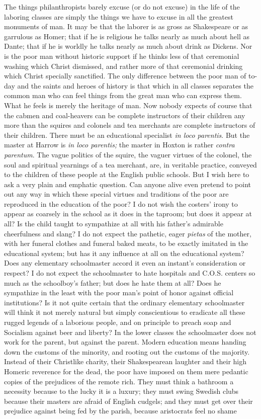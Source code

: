 \documentclass{book}
\begin{document}
The things philanthropists barely excuse (or do not excuse) in the life of the laboring classes are simply the things we have to excuse in all the greatest monuments of man. It may be that the laborer is as gross as Shakespeare or as garrulous as Homer; that if he is religious he talks nearly as much about hell as Dante; that if he is worldly he talks nearly as much about drink as Dickens. Nor is the poor man without historic support if he thinks less of that ceremonial washing which Christ dismissed, and rather more of that ceremonial drinking which Christ specially sanctified. The only difference between the poor man of to-day and the saints and heroes of history is that which in all classes separates the common man who can feel things from the great man who can express them. What he feels is merely the heritage of man. Now nobody expects of course that the cabmen and coal-heavers can be complete instructors of their children any more than the squires and colonels and tea merchants are complete instructors of their children. There must be an educational specialist \emph{in loco parentis}. But the master at Harrow is \emph{in loco parentis;} the master in Hoxton is rather \emph{contra parentum}. The vague politics of the squire, the vaguer virtues of the colonel, the soul and spiritual yearnings of a tea merchant, are, in veritable practice, conveyed to the children of these people at the English public schools. But I wish here to ask a very plain and emphatic question. Can anyone alive even pretend to point out any way in which these special virtues and traditions of the poor are reproduced in the education of the poor? I do not wish the costers’ irony to appear as coarsely in the school as it does in the taproom; but does it appear at all? Is the child taught to sympathize at all with his father’s admirable cheerfulness and slang? I do not expect the pathetic, eager \emph{pietas} of the mother, with her funeral clothes and funeral baked meats, to be exactly imitated in the educational system; but has it any influence at all on the educational system? Does any elementary schoolmaster accord it even an instant’s consideration or respect? I do not expect the schoolmaster to hate hospitals and C.O.S. centers so much as the schoolboy’s father; but does he hate them at all? Does he sympathize in the least with the poor man’s point of honor against official institutions? Is it not quite certain that the ordinary elementary schoolmaster will think it not merely natural but simply conscientious to eradicate all these rugged legends of a laborious people, and on principle to preach soap and Socialism against beer and liberty? In the lower classes the schoolmaster does not work for the parent, but against the parent. Modern education means handing down the customs of the minority, and rooting out the customs of the majority. Instead of their Christlike charity, their Shakespearean laughter and their high Homeric reverence for the dead, the poor have imposed on them mere pedantic copies of the prejudices of the remote rich. They must think a bathroom a necessity because to the lucky it is a luxury; they must swing Swedish clubs because their masters are afraid of English cudgels; and they must get over their prejudice against being fed by the parish, because aristocrats feel no shame 
\end{document}
